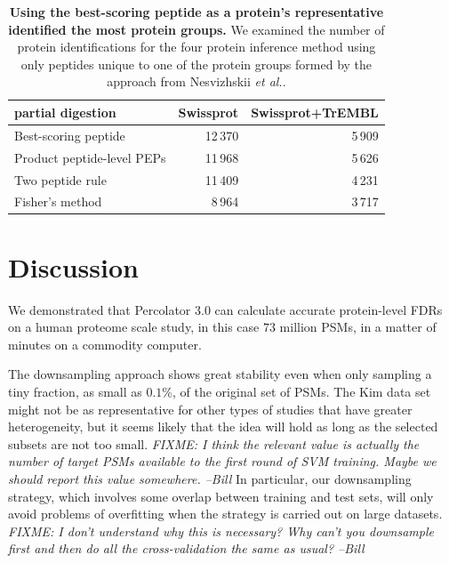 \documentclass{article}
\begin{document}
\begin{table}
  \begin{center}
    \begin{tabular}{lrr}
    \hline
    partial digestion & Swissprot & Swissprot+TrEMBL\\
    \hline
    Best-scoring peptide & 12\,370 & 5\,909\\
    Product peptide-level PEPs & 11\,968 & 5\,626\\
    Two peptide rule & 11\,409 & 4\,231\\
    Fisher's method & 8\,964 & 3\,717\\
    \hline
    \end{tabular}
  \end{center}
\caption{\label{tab:pandey-stats}\textbf{Using the best-scoring
    peptide as a protein's representative identified the most protein
    groups.} We examined the number of protein identifications for the
  four protein inference method using only peptides unique to one of
  the protein groups formed by the approach from Nesvizhskii {\em et
    al.}. }
\end{table}

\section*{Discussion}

We demonstrated that Percolator 3.0 can calculate accurate
protein-level FDRs on a human proteome scale study, in this case $73$
million PSMs, in a matter of minutes on a commodity computer.

The downsampling approach shows great stability even when only
sampling a tiny fraction, as small as $0.1\%$, of the original set of
PSMs.  The Kim data set might not be as representative for other
types of studies that have greater heterogeneity, but it seems likely
that the idea will hold as long as the selected subsets are not too
small.  {\em FIXME: I think the relevant value is actually the number
  of target PSMs available to the first round of SVM training. Maybe
  we should report this value somewhere.  --Bill} In particular, our
downsampling strategy, which involves some overlap between training
and test sets, will only avoid problems of overfitting when the
strategy is carried out on large datasets. {\em FIXME: I don't
  understand why this is necessary?  Why can't you downsample first
  and then do all the cross-validation the same as usual? --Bill}
\end{document}
